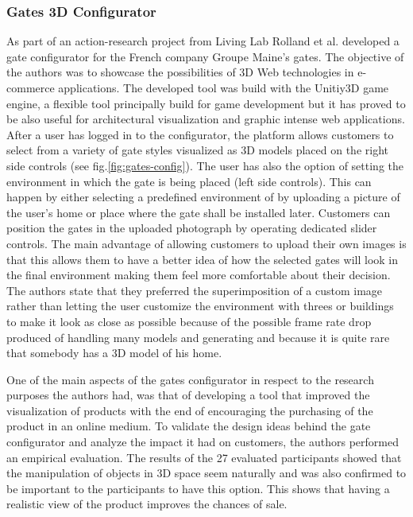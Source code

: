 \documentclass[medieninformatik-arbeit.tex]{subfiles}
\begin{document}
\subsubsection{Gates 3D Configurator}
As part of an action-research project from Living
Lab\cite{livinglabs:2015:Online} Rolland et al.\cite{rolland2012commerce}
developed a gate configurator for the French company Groupe Maine's gates. The
objective of the authors was to showcase the possibilities of 3D Web
technologies in e-commerce applications. The developed tool was build with the
Unitiy3D\cite{unity3d:2015:Online} game engine, a flexible tool principally
build for game development but it has proved to be also useful for architectural
visualization and graphic intense web applications. After a user has logged in
to the configurator, the platform allows customers to select from a variety of
gate styles visualized as 3D models placed on the right side controls (see fig.\ref{fig:gates-config}). The user has also the option of setting the environment in which the gate is being placed (left side controls). This can happen by either selecting a predefined environment of by uploading a picture of the user's home or place where the gate shall be installed later. Customers can position the gates in the uploaded photograph by operating dedicated slider controls. The main advantage of allowing customers to upload their own images is that this allows them to have a better idea of how the selected gates will look in the final environment making them feel more comfortable about their decision. The authors state that they preferred the superimposition of a custom image rather than letting the user customize the environment with threes or buildings to make it look as close as possible because of the possible frame rate drop produced of handling many models and generating and because it is quite rare that somebody has a 3D model of his home. 

One of the main aspects of the gates configurator in respect to the research purposes the authors had, was that of developing a tool that improved the visualization of products with the end of encouraging the purchasing of the product in an online medium. To validate the design ideas behind the gate configurator and analyze the impact it had on customers, the authors performed an empirical evaluation. The results of the 27 evaluated participants showed that the manipulation of objects in 3D space seem naturally and was also confirmed to be important to the participants to have this option. This shows that having a realistic view of the product improves the chances of sale. 
\end{document}
